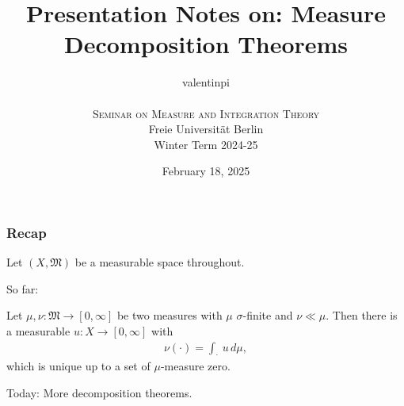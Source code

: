 \documentclass[10pt, hyperref={hidelinks}]{beamer}
\title{Presentation Notes on: Measure Decomposition Theorems}
\author{valentinpi\\\phantom{}\\\textsc{Seminar on Measure and Integration Theory}\\Freie Universität Berlin\\Winter Term 2024-25}
\date{February 18, 2025}
\begin{document}
    \frame{\titlepage}

    \begin{frame}
        \frametitle{Recap}

        Let \((X, \mathfrak{M})\) be a measurable space throughout.

        \phantom{}

        \pause

        So far:
        \begin{theorem} \label{thm:radon_nikodym_i}
            Let \(\mu, \nu\colon \mathfrak{M} \to [0, \infty]\) be two measures with \(\mu\) \(\sigma\)-finite and \(\nu \ll \mu\). Then there is a measurable \(u\colon X \to [0, \infty]\) with
            \begin{align}
                \nu(\cdot) = \int_\cdot \, u \, d\mu,
            \end{align}
            which is unique up to a set of \(\mu\)-measure zero.
        \end{theorem}

        \phantom{}

        \pause

        Today: More decomposition theorems.
    \end{frame}
\end{document}
